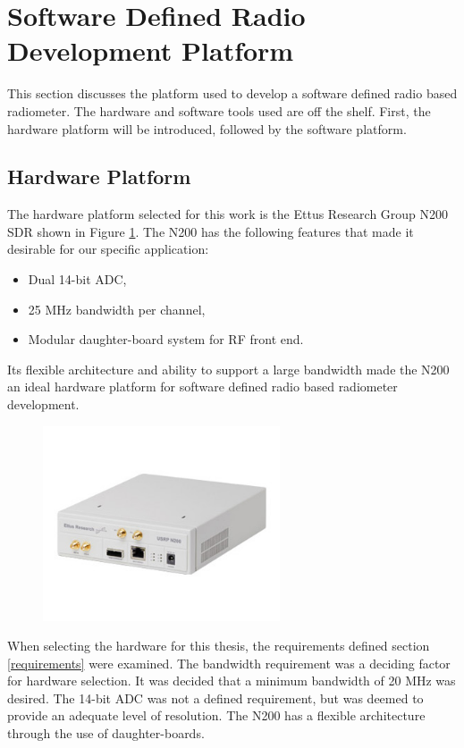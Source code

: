 \section{Software Defined Radio Development Platform} \label{SDR_platform}
This section discusses the platform used to develop a software defined radio based radiometer.  The hardware and software tools used are off the shelf.  First, the hardware platform will be introduced, followed by the software platform.  

\subsection{Hardware Platform}
The hardware platform selected for this work is the Ettus Research Group N200 SDR shown in Figure \ref{N200}.  The N200 has the following features that made it desirable for our specific application:

\begin{itemize}
\item Dual 14-bit ADC,
\item 25 MHz bandwidth per channel,
\item Modular daughter-board system for RF front end.
\end{itemize}

Its flexible architecture and ability to support a large bandwidth made the N200 an ideal hardware platform for software defined radio based radiometer development.

{\begin{figure}[h!tb] 
\centering
\includegraphics[width=7cm]{Images/n200}
\label{N200}
\end{figure}
}

When selecting the hardware for this thesis, the requirements defined section \ref{requirements} were examined.  The bandwidth requirement was a deciding factor for hardware selection.  It was decided that a minimum bandwidth of 20 MHz was desired.  The 14-bit ADC was not a defined requirement, but was deemed to provide an adequate level of resolution.  The N200 has a flexible architecture through the use of daughter-boards.  

